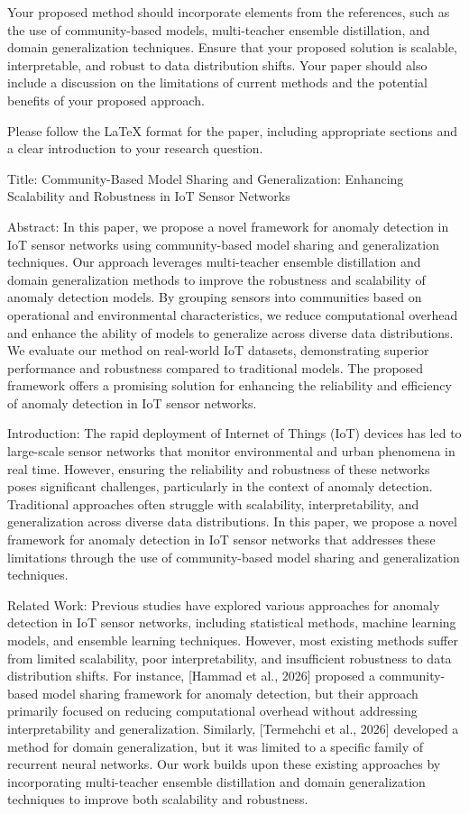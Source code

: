 Your proposed method should incorporate elements from the references, such as the use of community-based models, multi-teacher ensemble distillation, and domain generalization techniques. Ensure that your proposed solution is scalable, interpretable, and robust to data distribution shifts. Your paper should also include a discussion on the limitations of current methods and the potential benefits of your proposed approach. 

Please follow the LaTeX format for the paper, including appropriate sections and a clear introduction to your research question. 

Title: Community-Based Model Sharing and Generalization: Enhancing Scalability and Robustness in IoT Sensor Networks

Abstract:
In this paper, we propose a novel framework for anomaly detection in IoT sensor networks using community-based model sharing and generalization techniques. Our approach leverages multi-teacher ensemble distillation and domain generalization methods to improve the robustness and scalability of anomaly detection models. By grouping sensors into communities based on operational and environmental characteristics, we reduce computational overhead and enhance the ability of models to generalize across diverse data distributions. We evaluate our method on real-world IoT datasets, demonstrating superior performance and robustness compared to traditional models. The proposed framework offers a promising solution for enhancing the reliability and efficiency of anomaly detection in IoT sensor networks.

Introduction:
The rapid deployment of Internet of Things (IoT) devices has led to large-scale sensor networks that monitor environmental and urban phenomena in real time. However, ensuring the reliability and robustness of these networks poses significant challenges, particularly in the context of anomaly detection. Traditional approaches often struggle with scalability, interpretability, and generalization across diverse data distributions. In this paper, we propose a novel framework for anomaly detection in IoT sensor networks that addresses these limitations through the use of community-based model sharing and generalization techniques.

Related Work:
Previous studies have explored various approaches for anomaly detection in IoT sensor networks, including statistical methods, machine learning models, and ensemble learning techniques. However, most existing methods suffer from limited scalability, poor interpretability, and insufficient robustness to data distribution shifts. For instance, [Hammad et al., 2026] proposed a community-based model sharing framework for anomaly detection, but their approach primarily focused on reducing computational overhead without addressing interpretability and generalization. Similarly, [Termehchi et al., 2026] developed a method for domain generalization, but it was limited to a specific family of recurrent neural networks. Our work builds upon these existing approaches by incorporating multi-teacher ensemble distillation and domain generalization techniques to improve both scalability and robustness.

